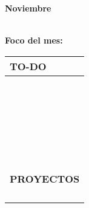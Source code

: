 {\raggedleft
	\fontsize{25}{50}\selectfont
	\textbf{Noviembre}\\
}



	\textbf{\\Foco del mes:} \dotfill
	\renewcommand{\arraystretch}{1.5}\scriptsize
		\begin{longtabu} to \textwidth { X[l]}
		\centering \small{\textbf{TO-DO}} \\
		\toprule
		\makebox{$\square$} \dotfill\\
		\makebox{$\square$} \dotfill\\
		\makebox{$\square$} \dotfill\\
		\makebox{$\square$} \dotfill\\
		\makebox{$\square$} \dotfill\\
		\makebox{$\square$} \dotfill\\
		\makebox{$\square$} \dotfill\\
		\makebox{$\square$} \dotfill\\
		\makebox{$\square$} \dotfill\\
		\makebox{$\square$} \dotfill\\
		\makebox{$\square$} \dotfill\\
		\makebox{$\square$} \dotfill\\
		\makebox{$\square$} \dotfill\\
		\makebox{$\square$} \dotfill\\
		\makebox{$\square$} \dotfill\\
		\makebox{$\square$} \dotfill\\
		\makebox{$\square$} \dotfill\\
		\makebox{$\square$} \dotfill\\
		\makebox{$\square$} \dotfill\\
		\makebox{$\square$} \dotfill\\
		\makebox{$\square$} \dotfill\\
		\makebox{$\square$} \dotfill\\
		\makebox{$\square$} \dotfill\\
		\makebox{$\square$} \dotfill\\
		\makebox{$\square$} \dotfill\\

		\bottomrule

		\\
		\small{\textbf{PROYECTOS}} \\
		\makebox{$\square$} \dotfill\\
		\makebox{$\square$} \dotfill\\
		\makebox{$\square$} \dotfill\\
		\makebox{$\square$} \dotfill\\
	\end{longtabu}


